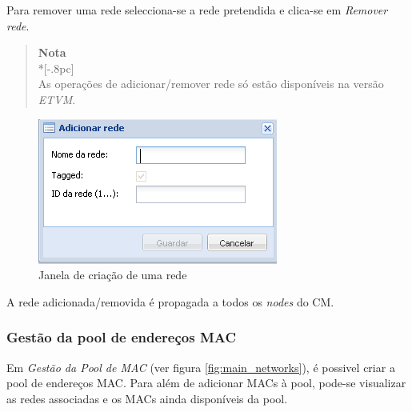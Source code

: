 Para remover uma rede selecciona-se a rede pretendida e clica-se em \emph{Remover rede}.

\begin{quote}
	{\large \bf Nota} \\*[-.8pc]
	\underline{\hspace{6in}} \\
	As operações de adicionar/remover rede só estão disponíveis na versão \emph{ETVM}.
\end{quote}


\begin{figure}[H]
	\begin{center}
	\includegraphics[scale=0.5]{screenshots/network_create.png}
	\caption{Janela de criação de uma rede}
	\label{fig:network_create}
	\end{center}
\end{figure}

A rede adicionada/removida é propagada a todos os \emph{nodes} do CM.


\subsubsection{Gestão da pool de endereços MAC}
\label{sec:mac_pool}

Em \emph{Gestão da Pool de MAC} (ver figura \ref{fig:main_networks}), é possivel criar a pool de endereços MAC.
Para além de adicionar MACs à pool, pode-se visualizar as redes associadas e os MACs ainda disponíveis da pool.

